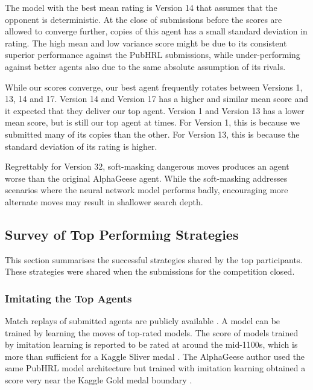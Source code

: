 The model with the best mean rating is Version 14 that assumes that the opponent is deterministic. At the close of submissions before the scores are allowed to converge further, copies of this agent has a small standard deviation in rating. The high mean and low variance score might be due to its consistent superior performance against the PubHRL submissions, while under-performing against better agents also due to the same absolute assumption of its rivals.

While our scores converge, our best agent frequently rotates between Versions 1, 13, 14 and 17. Version 14 and Version 17 has a higher and similar mean score and it expected that they deliver our top agent. Version 1 and Version 13 has a lower mean score, but is still our top agent at times. For Version 1, this is because we submitted many of its copies than the other. For Version 13, this is because the standard deviation of its rating is higher.

Regrettably for Version 32, soft-masking dangerous moves produces an agent worse than the original AlphaGeese agent. While the soft-masking addresses scenarios where the neural network model performs badly, encouraging more alternate moves may result in shallower search depth. 

\subsection{Survey of Top Performing Strategies}
\label{subsection_survey_of_top_performers}

This section summarises the successful strategies shared by the top participants. These strategies were shared when the submissions for the competition closed. 

\subsubsection{Imitating the Top Agents}
\label{subsubsection_imitation}

Match replays of submitted agents are publicly available \cite{notebook_scraper}. A model can be trained by learning the moves of top-rated models. The score of models trained by imitation learning is reported to be rated at around the mid-1100s, which is more than sufficient for a Kaggle Sliver medal \cite{sharing_robga}. The AlphaGeese author used the same PubHRL model architecture but trained with imitation learning obtained a score very near the Kaggle Gold medal boundary \cite{notebook_alphageese_imitation}.


